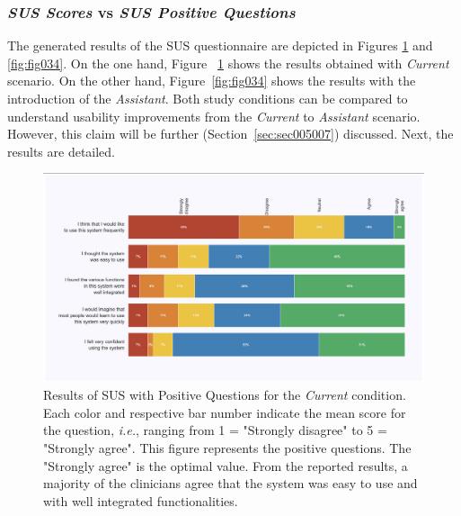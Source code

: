 \subsubsection{{\it SUS Scores} vs {\it SUS Positive Questions}}
\label{sec:sec005006001001}

The generated results of the \ac{SUS} questionnaire are depicted in Figures \ref{fig:fig033} and \ref{fig:fig034}.
On the one hand, Figure ~\ref{fig:fig033} shows the results obtained with
{\it Current} scenario.
On the other hand, Figure~\ref{fig:fig034} shows the results with the introduction of the {\it Assistant}.
Both study conditions can be compared to understand usability improvements from the {\it Current} to {\it Assistant} scenario.
However, this claim will be further (Section~\ref{sec:sec005007}) discussed.
Next, the results are detailed.

\begin{figure}[htbp]
\centering
\includegraphics[width=\textwidth]{images/fig033}
\caption{Results of SUS with Positive Questions for the {\it Current} condition. Each color and respective bar number indicate the mean score for the question, {\it i.e.}, ranging from 1 = "Strongly disagree" to 5 = "Strongly agree". This figure represents the positive questions. The "Strongly agree" is the optimal value. From the reported results, a majority of the clinicians agree that the system was easy to use and with well integrated functionalities.}
\label{fig:fig033}
\end{figure}

